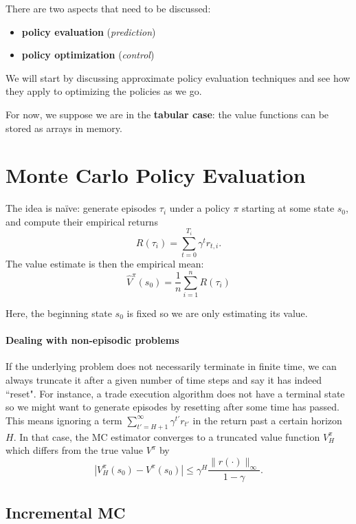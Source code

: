 \documentclass[../course-notes.tex]{subfiles}
\begin{document}
There are two aspects that need to be discussed:
\begin{itemize}
	\item \textbf{policy evaluation} (\textit{prediction})
	\item \textbf{policy optimization} (\textit{control})
\end{itemize}


We will start by discussing approximate policy evaluation techniques and see how they apply to optimizing the policies as we go.

For now, we suppose we are in the \textbf{tabular case}: the value functions can be stored as arrays in memory.


\section{Monte Carlo Policy Evaluation}

The idea is naïve: generate episodes $\tau_i$ under a policy $\pi$ starting at some state $s_0$, and compute their empirical returns
\[
	R(\tau_i) = \sum_{t=0}^{T_i} \gamma^t r_{t,i}.
\]
The value estimate is then the empirical mean:
\begin{equation}
	\widehat{V}^\pi(s_0) = \frac{1}{n}\sum_{i=1}^{n} R(\tau_i)
\end{equation}

Here, the beginning state $s_0$ is fixed so we are only estimating its value.


\paragraph{Dealing with non-episodic problems} If the underlying problem does not necessarily terminate in finite time, we can always truncate it after a given number of time steps and say it has indeed ``reset". For instance, a trade execution algorithm does not have a terminal state so we might want to generate episodes by resetting after some time has passed. This means ignoring a term $\sum_{t'=H+1}^\infty \gamma^{t'} r_{t'}$ in the return past a certain horizon $H$. In that case, the MC estimator converges to a truncated value function $V_H^\pi$ which differs from the true value $V^\pi$ by
\[
	|V_H^\pi(s_0) - V^\pi(s_0)| \leq \gamma^H\frac{\| r(\cdot)\|_\infty}{1 - \gamma}.
\]


\subsection{Incremental MC}
\end{document}
